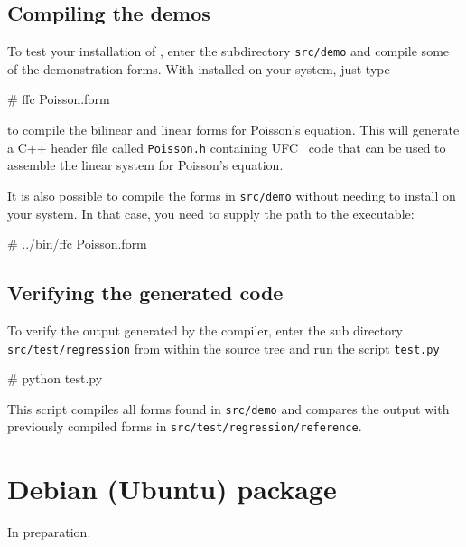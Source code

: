\subsection{Compiling the demos}

To test your installation of \ffc{}, enter the subdirectory
\texttt{src/demo} and compile some of the demonstration forms.
With \ffc{} installed on your system, just type
\begin{code}
# ffc Poisson.form
\end{code}
to compile the bilinear and linear forms for Poisson's equation.
This will generate a C++ header file called \texttt{Poisson.h}
containing UFC~\cite{www:ufc} code that can be used to assemble
the linear system for Poisson's equation.

It is also possible to compile the forms in \texttt{src/demo} without
needing to install \ffc{} on your system. In that case, you need to
supply the path to the \ffc{} executable:
\begin{code}
# ../bin/ffc Poisson.form
\end{code}

\subsection{Verifying the generated code}

To verify the output generated by the compiler, enter the sub directory
\texttt{src/test/regression} from within the \ffc{} source tree and
run the script \texttt{test.py}
\begin{code}
# python test.py
\end{code}
This script compiles all forms found in \texttt{src/demo} and compares
the output with previously compiled forms in \texttt{src/test/regression/reference}.

\section{Debian (Ubuntu) package}

In preparation.
